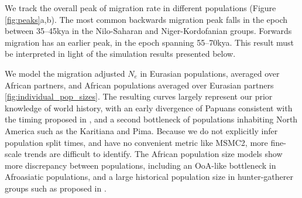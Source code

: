   

We track the overall peak of migration rate in different populations (Figure \ref{fig:peaks}a,b). The most common backwards migration peak falls in the epoch between 35--45kya in the Nilo-Saharan and Niger-Kordofanian groups. Forwards migration has an earlier peak, in the epoch spanning 55--70kya. This result must be interpreted in light of the simulation results presented below.  

We model the migration adjusted $N_e$ in Eurasian populations, averaged over African partners, and African populations averaged over Eurasian partners \ref{fig:individual_pop_sizes}. The resulting curves largely represent our prior knowledge of world history, with an early divergence of Papuans consistent with the timing proposed in \cite{Malaspinas2016}, and a second bottleneck of populations inhabiting North America such as the Karitiana and Pima. Because we do not explicitly infer population split times, and have no convenient metric like MSMC2, more fine-scale trends are difficult to identify. The African population size models show more discrepancy between populations, including an OoA-like bottleneck in Afroasiatic populations, and a large historical population size in hunter-gatherer groups such as proposed in \cite{Lipson2019}. 


